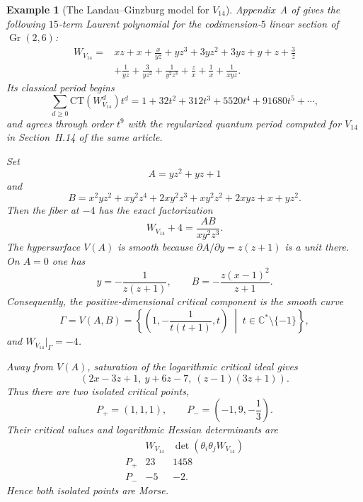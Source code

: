 \documentclass[11pt]{amsart}
\newtheorem{example}{Example}[section]
\begin{document}
\begin{example}[The Landau--Ginzburg model for $V_{14}$]
Appendix~A of \cite{CoatesCortiGalkinKasprzyk2016} gives the following
$15$-term Laurent polynomial for the codimension-$5$ linear section of
$\operatorname{Gr}(2,6)$:
\[
\begin{aligned}
W_{V_{14}}={}&xz+x+\frac{x}{yz}+yz^3+3yz^2+3yz+y+z+\frac3z\\
&+\frac1{yz}+\frac3{yz^2}+\frac1{y^2z^3}
+\frac zx+\frac1x+\frac1{xyz}.
\end{aligned}
\]
Its classical period begins
\[
\sum_{d\geq0}\mathrm{CT}(W_{V_{14}}^d)t^d
=1+32t^2+312t^3+5520t^4+91680t^5+\cdots,
\]
and agrees through order $t^9$ with the regularized quantum period computed
for $V_{14}$ in Section~H.14 of the same article.

Set
\[
A=yz^2+yz+1
\]
and
\[
B=x^2yz^2+xy^2z^4+2xy^2z^3+xy^2z^2+2xyz+x+yz^2.
\]
Then the fiber at $-4$ has the exact factorization
\[
W_{V_{14}}+4=\frac{AB}{xy^2z^3}.
\]
The hypersurface $V(A)$ is smooth because
$\partial A/\partial y=z(z+1)$ is a unit there. On $A=0$ one has
\[
y=-\frac1{z(z+1)},
\qquad
B=-\frac{z(x-1)^2}{z+1}.
\]
Consequently, the positive-dimensional critical component is the smooth curve
\[
\Gamma=V(A,B)
=\left\{
\left(1,-\frac1{t(t+1)},t\right)
\;\middle|\;
t\in\mathbb C^*\setminus\{-1\}
\right\},
\]
and $W_{V_{14}}|_\Gamma=-4$.

Away from $V(A)$, saturation of the logarithmic critical ideal gives
\[
(2x-3z+1,\ y+6z-7,\ (z-1)(3z+1)).
\]
Thus there are two isolated critical points,
\[
P_+=(1,1,1),
\qquad
P_-=\left(-1,9,-\frac13\right).
\]
Their critical values and logarithmic Hessian determinants are
\[
\begin{array}{c|cc}
 & W_{V_{14}} & \det(\theta_i\theta_jW_{V_{14}})\\ \hline
P_+ & 23 & 1458\\
P_- & -5 & -2.
\end{array}
\]
Hence both isolated points are Morse.


\end{example}
\end{document}
